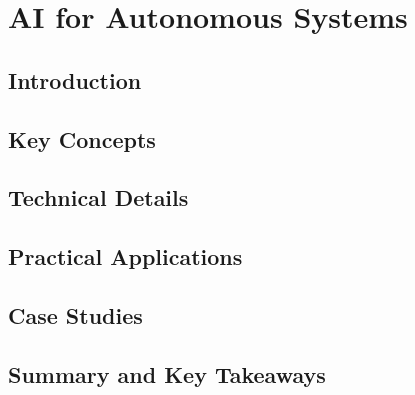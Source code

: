 ﻿%

\chapter{AI for Autonomous Systems}
\label{ch:chapter-21}

\section{Introduction}


\section{Key Concepts}


\section{Technical Details}


\section{Practical Applications}


\section{Case Studies}


\section{Summary and Key Takeaways}


